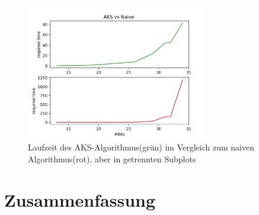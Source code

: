 \documentclass[12pt,oneside]{article}
\theoremstyle{remark}
\theoremstyle{definition}
\begin{document}
\begin{figure}[h]
\includegraphics[width=8cm]{plots/aksVsNaiveSubPlots.png}
\centering
\caption{Laufzeit des AKS-Algorithmus(grün) im Vergleich zum naiven Algorithmus(rot), aber in getrennten Subplots}
\end{figure}

\section{Zusammenfassung}


\clearpage
\lhead{}
\printbibliography
{}


\clearpage
\appendix
\end{document}
